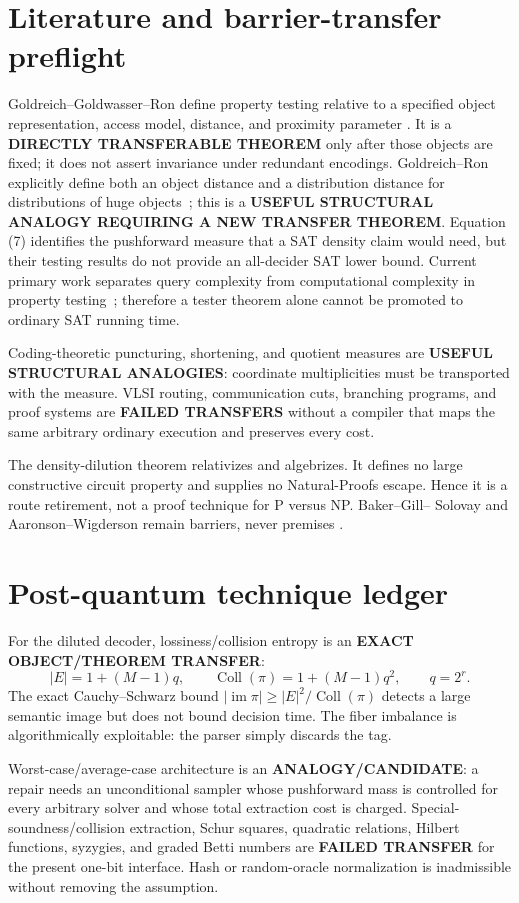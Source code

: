 \documentclass[11pt]{article}
\begin{document}
\section{Literature and barrier-transfer preflight}
Goldreich--Goldwasser--Ron define property testing relative to a specified
object representation, access model, distance, and proximity parameter
\cite{GGR98}.  It is a \textbf{DIRECTLY TRANSFERABLE THEOREM} only after those
objects are fixed; it does not assert invariance under redundant encodings.
Goldreich--Ron explicitly define both an object distance and a distribution
distance for distributions of huge objects~\cite{GR23}; this is a
\textbf{USEFUL STRUCTURAL ANALOGY REQUIRING A NEW TRANSFER THEOREM}. Equation
(7) identifies the pushforward measure that a SAT density claim would need,
but their testing results do not provide an all-decider SAT lower bound.
Current primary work separates query complexity from computational complexity
in property testing~\cite{FPR26}; therefore a tester theorem alone cannot be
promoted to ordinary SAT running time.

Coding-theoretic puncturing, shortening, and quotient measures are
\textbf{USEFUL STRUCTURAL ANALOGIES}: coordinate multiplicities must be
transported with the measure. VLSI routing, communication cuts, branching
programs, and proof systems are \textbf{FAILED TRANSFERS} without a compiler
that maps the same arbitrary ordinary execution and preserves every cost.

The density-dilution theorem relativizes and algebrizes. It defines no large
constructive circuit property and supplies no Natural-Proofs escape. Hence it
is a route retirement, not a proof technique for P versus NP. Baker--Gill--
Solovay and Aaronson--Wigderson remain barriers, never premises
\cite{BGS75,AW09}.

\section{Post-quantum technique ledger}
For the diluted decoder, lossiness/collision entropy is an
\textbf{EXACT OBJECT/THEOREM TRANSFER}:
\[
 |E|=1+(M-1)q,\qquad
 \operatorname{Coll}(\pi)=1+(M-1)q^2,\qquad q=2^r.        \tag{9}
\]
The exact Cauchy--Schwarz bound
\(|\operatorname{im}\pi|\ge |E|^2/\operatorname{Coll}(\pi)\) detects a large
semantic image but does not bound decision time. The fiber imbalance is
algorithmically exploitable: the parser simply discards the tag.

Worst-case/average-case architecture is an \textbf{ANALOGY/CANDIDATE}: a
repair needs an unconditional sampler whose pushforward mass is controlled
for every arbitrary solver and whose total extraction cost is charged.
Special-soundness/collision extraction, Schur squares, quadratic relations,
Hilbert functions, syzygies, and graded Betti numbers are
\textbf{FAILED TRANSFER} for the present one-bit interface. Hash or
random-oracle normalization is inadmissible without removing the assumption.
\end{document}
